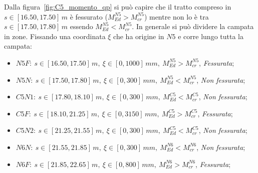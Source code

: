 Dalla figura~\ref{fig:C5_momento_qp} si può capire che il tratto compreso in $s\in[16.50, 17.50]\,m$ è fessurato ($M_{Ed}^{N5} > M_{cr}^{N5}$) mentre non lo è tra $s\in[17.50, 17.80]\,m$ essendo $M_{Ed}^{N5} < M_{cr}^{N5}$. In generale si può dividere la campata in zone. Fissando una coordinata $\xi$ che ha origine in $N5$ e corre lungo tutta la campata:
\begin{itemize}
	\item $N5F:~s\in[16.50, 17.50]\,m,~\xi\in[0, 1000]\,mm,~M_{Ed}^{N5} > M_{cr}^{N5}$, \emph{Fessurata}; 
	\item $N5N:~s\in[17.50, 17.80]\,m,~\xi\in[0, 300]\,mm,~M_{Ed}^{N5} < M_{cr}^{N5}$, \emph{Non fessurata}; 
	\item $C5N1:~s\in[17.80, 18.10]\,m,~\xi\in[0, 300]\,mm,~M_{Ed}^{C5} < M_{cr}^{C5}$, \emph{Non fessurata}; 
	\item $C5F:~s\in[18.10, 21.25]\,m,~\xi\in[0, 3150]\,mm,~M_{Ed}^{C5} > M_{cr}^{C5}$, \emph{Fessurata};
	\item $C5N2:~s\in[21.25, 21.55]\,m,~\xi\in[0, 300]\,mm,~M_{Ed}^{C5} < M_{cr}^{C5}$, \emph{Non fessurata}; 
	\item $N6N:~s\in[21.55, 21.85]\,m,~\xi\in[0, 300]\,mm,~M_{Ed}^{N6} < M_{cr}^{N6}$, \emph{Non fessurata};
	\item $N6F:~s\in[21.85, 22.65]\,m,~\xi\in[0, 800]\,mm,~M_{Ed}^{N6} > M_{cr}^{N6}$, \emph{Fessurata};
\end{itemize}

